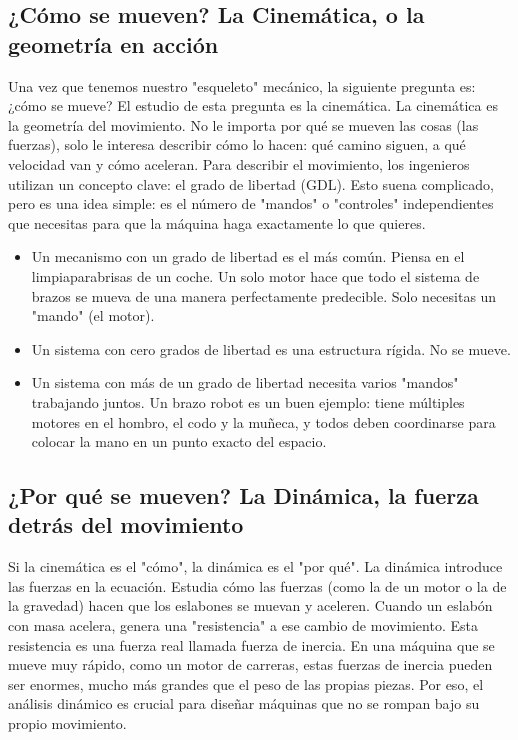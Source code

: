 \documentclass[12pt,a4paper]{article}
\begin{document}
\subsection{¿Cómo se mueven? La Cinemática, o la geometría en acción}
Una vez que tenemos nuestro "esqueleto" mecánico, la siguiente pregunta es: ¿cómo se mueve? El estudio de esta pregunta es la cinemática. La cinemática es la geometría del movimiento. No le importa por qué se mueven las cosas (las fuerzas), solo le interesa describir cómo lo hacen: qué camino siguen, a qué velocidad van y cómo aceleran.
Para describir el movimiento, los ingenieros utilizan un concepto clave: el grado de libertad (GDL). Esto suena complicado, pero es una idea simple: es el número de "mandos" o "controles" independientes que necesitas para que la máquina haga exactamente lo que quieres.
\begin{itemize}
    \item Un mecanismo con un grado de libertad es el más común. Piensa en el limpiaparabrisas de un coche. Un solo motor hace que todo el sistema de brazos se mueva de una manera perfectamente predecible. Solo necesitas un "mando" (el motor).
    \item Un sistema con cero grados de libertad es una estructura rígida. No se mueve.
    \item Un sistema con más de un grado de libertad necesita varios "mandos" trabajando juntos. Un brazo robot es un buen ejemplo: tiene múltiples motores en el hombro, el codo y la muñeca, y todos deben coordinarse para colocar la mano en un punto exacto del espacio.
\end{itemize}

\subsection{¿Por qué se mueven? La Dinámica, la fuerza detrás del movimiento}
Si la cinemática es el "cómo", la dinámica es el "por qué". La dinámica introduce las fuerzas en la ecuación. Estudia cómo las fuerzas (como la de un motor o la de la gravedad) hacen que los eslabones se muevan y aceleren.
Cuando un eslabón con masa acelera, genera una "resistencia" a ese cambio de movimiento. Esta resistencia es una fuerza real llamada fuerza de inercia. En una máquina que se mueve muy rápido, como un motor de carreras, estas fuerzas de inercia pueden ser enormes, mucho más grandes que el peso de las propias piezas. Por eso, el análisis dinámico es crucial para diseñar máquinas que no se rompan bajo su propio movimiento.
\end{document}

